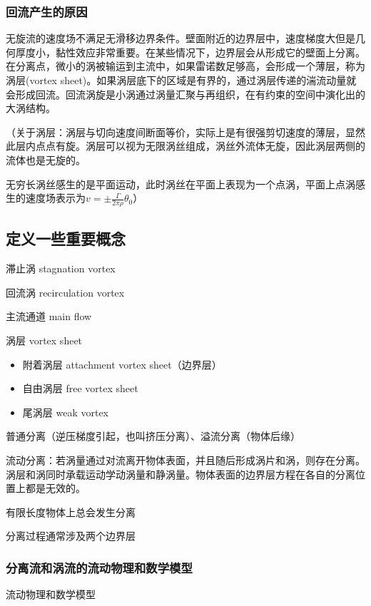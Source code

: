 \subsubsection{回流产生的原因}
无旋流的速度场不满足无滑移边界条件。壁面附近的边界层中，速度梯度大但是几何厚度小，黏性效应非常重要。在某些情况下，边界层会从形成它的壁面上分离。在分离点，微小的涡被输运到主流中，如果雷诺数足够高，会形成一个薄层，称为涡层(vortex sheet)。如果涡层底下的区域是有界的，通过涡层传递的湍流动量就会形成回流。回流涡旋是小涡通过涡量汇聚与再组织，在有约束的空间中演化出的大涡结构。

（关于涡层：涡层与切向速度间断面等价，实际上是有很强剪切速度的薄层，显然此层内点点有旋。涡层可以视为无限涡丝组成，涡丝外流体无旋，因此涡层两侧的流体也是无旋的。

无穷长涡丝感生的是平面运动，此时涡丝在平面上表现为一个点涡，平面上点涡感生的速度场表示为$v=\pm\frac{\Gamma
}{2\pi\rho}\theta_{0}$）


\subsection{定义一些重要概念}
滞止涡 stagnation vortex

回流涡 recirculation vortex

主流通道 main flow

涡层 vortex sheet
\begin{itemize}
    \item 附着涡层 attachment vortex sheet（边界层）
    \item 自由涡层 free vortex sheet
    \item 尾涡层 weak vortex 
\end{itemize}

普通分离（逆压梯度引起，也叫挤压分离）、溢流分离（物体后缘）

流动分离：若涡量通过对流离开物体表面，并且随后形成涡片和涡，则存在分离。涡层和涡同时承载运动学动涡量和静涡量。物体表面的边界层方程在各自的分离位置上都是无效的。

有限长度物体上总会发生分离

分离过程通常涉及两个边界层

\subsubsection{分离流和涡流的流动物理和数学模型}
流动物理和数学模型


